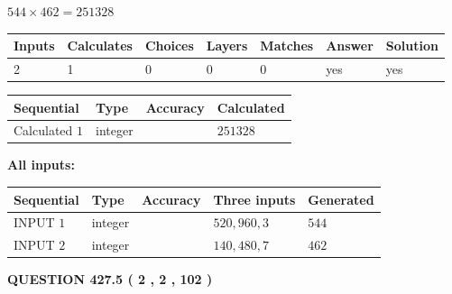 \documentclass{ctexart}
\begin{document}
 

$ %
544 \times  %
462=   %
251328$
 
 
\noindent{}
 
 

 
   
   
   
   
\noindent\begin{tabular}{|l|l|l|l|l|l|l|}
 \hline
Inputs & Calculates & Choices & Layers & Matches & Answer & Solution \\ \hline
 2  & 
 1  & 
 0
  & 
 0  & 
 0  & 
  yes & 
  yes 
  \\ \hline
 \end{tabular}
   
   
   
   
\noindent{}
   
   
  
  
\noindent\begin{tabular}{|l|l|l|l|}
\hline
 Sequential & Type & Accuracy & Calculated \\ 
\hline
 
 
  Calculated $  1 $ & integer &  & 
  $ 251328 $ 
 \\  \hline  
 \end{tabular}
   
   
   
   
\noindent\vspace{0.1in}\hspace{-0.08in} {\textbf{\Large{All inputs: }}}
   
   
  
  
\noindent\begin{tabular}{|l|l|l|l|l|}
\hline
 Sequential & Type & Accuracy & Three inputs & Generated \\ 
\hline
 
 
  INPUT $  1 $ & integer &  & $
 520
 , 
 960
 , 
 3
 $ & $ 544 $ 
 \\  \hline  
 
 
  INPUT $  2 $ & integer &  & $
 140
 , 
 480
 , 
 7
 $ & $ 462 $ 
 \\  \hline  
 \end{tabular}
   
   
  
\vspace{0.2in}
  
{\textbf{\Large{QUESTION
427.5 
 ( 2 , 2 , 102 )
}}}
  
\end{document}
